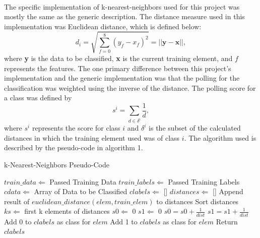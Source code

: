 \documentclass[12pt]{article}
\begin{document}
    \paragraph{}
    The specific implementation of k-nearest-neighbors used for this project was mostly the same as the generic description. The distance measure used in this implementation was Euclidean distance, which is defined below:
    \begin{equation}
        \label{Eq:1}
    	d_i = \sqrt{\sum_{f=0}^{8} (y_f - x_f)^2} = ||\mathbf{y} - \mathbf{x}||,
    \end{equation}
    where \textbf{y} is the data to be classified, \textbf{x} is the current training element, and $f$ represents the features. The one primary difference between this project's implementation and the generic implementation was that the polling for the classification was weighted using the inverse of the distance. The polling score for a class was defined by
    \begin{equation}
    	\label{Eq:2}
    	s^i = \sum_{d \in \delta^i} \frac{1}{d},
    \end{equation}
    where $s^i$ represents the score for class $i$ and $\delta^i$ is the subset of the calculated distances in which the training element used was of class $i$. The algorithm used is described by the pseudo-code in algorithm 1.
    \begin{algorithm} \label{kNN}
    	\caption{k-Nearest-Neighbors Pseudo-Code}
    	\begin{algorithmic}
    		\State $train\_data \Leftarrow$ Passed Training Data
    		\State $train\_labels \Leftarrow$ Passed Training Labels
    		\State $cdata \Leftarrow$ Array of Data to be Classified
    		\State $clabels \Leftarrow$ []
    		\State $distances \Leftarrow$ []
    		\State Append result of $euclidean\_distance(elem, train\_elem)$ to distances
    		\EndFor
    		\State Sort distances
    		\State $ks \Leftarrow$ first k elements of distances
    		\State $s0 \Leftarrow$ 0
    		\State $s1 \Leftarrow$ 0
    		\State $s0 = s0 + \frac{1}{dist}$
    		\Else
    		\State $s1 = s1 + \frac{1}{dist}$
    		\EndIf
    		\EndFor
    		\State Add 0 to $clabels$ as class for $elem$
    		\Else
    		\State Add 1 to $clabels$ as class for $elem$
    		\EndIf
    		\EndFor
    		\State Return $clabels$
    	\end{algorithmic} 
    \end{algorithm}
\end{document}
